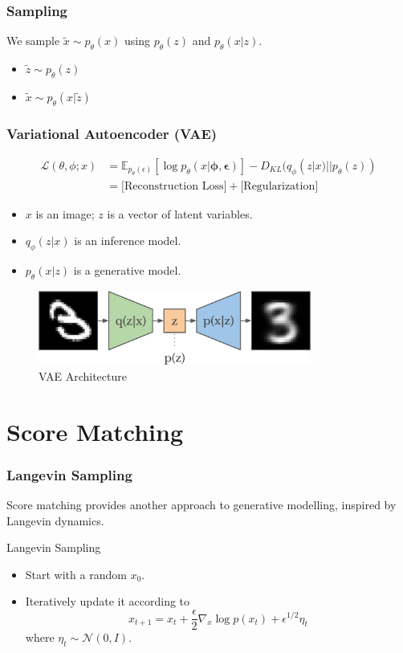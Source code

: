 \documentclass{beamer}
\begin{document}
\begin{frame}
    \frametitle{Sampling}
    We sample $\tilde{x} \sim p_\theta(x)$ using $p_\theta(z)$ and $p_\theta(x|z)$.
    \begin{itemize}
        \item $\tilde{z} \sim p_\theta(z)$
        \item $\tilde{x} \sim p_\theta(x|\tilde{z})$
    \end{itemize}
\end{frame}

\begin{frame}
    \frametitle{Variational Autoencoder (VAE)}
    \begin{align*}
        \mathcal{L}(\theta, \phi; x) &= \mathbb{E}_{p_\theta(\epsilon)} \left[ \log p_\theta(x|\mathbf{\phi}, \mathbf{\epsilon}) \right] - D_{KL}(q_\phi(z|x) || p_\theta(z)) \\
        &= \text{[Reconstruction Loss]} + \text{[Regularization]}
    \end{align*}
    
    \begin{itemize}
        \item $x$ is an image; $z$ is a vector of latent variables.
        \item $q_\phi(z|x)$ is an inference model.
        \item $p_\theta(x|z)$ is a generative model.
    \end{itemize}
    
    \begin{figure}
        \centering
        \includegraphics[width=0.8\textwidth]{images/vae.png}
        \caption{VAE Architecture}
        \label{fig:vae}
    \end{figure}
\end{frame}


\section{Score Matching}

\begin{frame}
    \frametitle{Langevin Sampling}
    Score matching provides another approach to generative modelling, inspired by Langevin dynamics.
    \begin{block}{Langevin Sampling}
        \begin{itemize}
            \item Start with a random $x_0$.
            \item Iteratively update it according to
            \[x_{t+1} = x_t + \frac{\epsilon}{2} \nabla_x \log p(x_t) + \epsilon^{1/2} \eta_t\]
            where $\eta_t \sim \mathcal{N}(0, I)$.
        \end{itemize}
    \end{block}
\end{frame}
\end{document}
